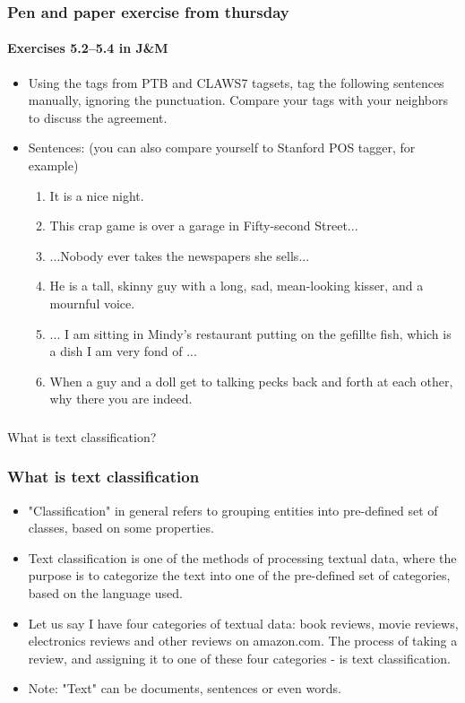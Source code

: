 \documentclass{beamer}
\begin{document}
\begin{frame}
\frametitle{Pen and paper exercise from thursday}
\framesubtitle{Exercises 5.2--5.4 in J\&M}
\begin{itemize}
\item Using the tags from PTB and CLAWS7 tagsets, tag the following sentences manually, ignoring the punctuation. Compare your tags with your neighbors to discuss the agreement.
\item Sentences: (you can also compare yourself to Stanford POS tagger, for example)
\begin{enumerate}
\item It is a nice night.
\item This crap game is over a garage in Fifty-second Street...
\item ...Nobody ever takes the newspapers she sells...
\item He is a tall, skinny guy with a long, sad, mean-looking kisser, and a mournful voice.
\item ... I am sitting in Mindy's restaurant putting on the gefillte fish, which is a dish I am very fond of ...
\item When a guy and a doll get to talking pecks back and forth at each other, why there you are indeed. 
\end{enumerate}
\end{itemize}
\end{frame}


\begin{frame}
\frametitle{}
\begin{center}
\Large What is text classification?
\end{center}
\end{frame}

\begin{frame}
\frametitle{What is text classification}
\begin{itemize}
\item "Classification" in general refers to grouping entities into pre-defined set of classes, based on some properties. \pause 
\item Text classification is one of the methods of processing textual data, where the purpose is to categorize the text into one of the pre-defined set of categories, based on the language used. \pause
\item Let us say I have four categories of textual data: book reviews, movie reviews, electronics reviews and other reviews on amazon.com. The process of taking a review, and assigning it to one of these four categories - is text classification. 
\item Note: "Text" can be documents, sentences or even words.
\end{itemize}
\end{frame}
\end{document}
